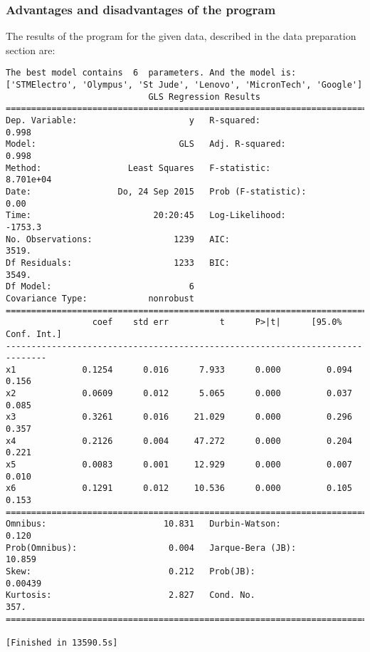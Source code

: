 \documentclass{article}
\begin{document}
\subsubsection{Advantages and disadvantages of the program}
The results of the program for the given data, described in the data preparation section are:
\begin{verbatim}
The best model contains  6  parameters. And the model is:
['STMElectro', 'Olympus', 'St Jude', 'Lenovo', 'MicronTech', 'Google']
                            GLS Regression Results                            
==============================================================================
Dep. Variable:                      y   R-squared:                       0.998
Model:                            GLS   Adj. R-squared:                  0.998
Method:                 Least Squares   F-statistic:                 8.701e+04
Date:                 Do, 24 Sep 2015   Prob (F-statistic):               0.00
Time:                        20:20:45   Log-Likelihood:                -1753.3
No. Observations:                1239   AIC:                             3519.
Df Residuals:                    1233   BIC:                             3549.
Df Model:                           6                                         
Covariance Type:            nonrobust                                         
==============================================================================
                 coef    std err          t      P>|t|      [95.0% Conf. Int.]
------------------------------------------------------------------------------
x1             0.1254      0.016      7.933      0.000         0.094     0.156
x2             0.0609      0.012      5.065      0.000         0.037     0.085
x3             0.3261      0.016     21.029      0.000         0.296     0.357
x4             0.2126      0.004     47.272      0.000         0.204     0.221
x5             0.0083      0.001     12.929      0.000         0.007     0.010
x6             0.1291      0.012     10.536      0.000         0.105     0.153
==============================================================================
Omnibus:                       10.831   Durbin-Watson:                   0.120
Prob(Omnibus):                  0.004   Jarque-Bera (JB):               10.859
Skew:                           0.212   Prob(JB):                      0.00439
Kurtosis:                       2.827   Cond. No.                         357.
==============================================================================

[Finished in 13590.5s]
\end{verbatim}
\end{document}
